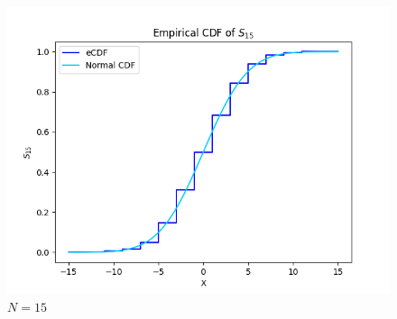 \documentclass{article}
\begin{document}
\begin{figure}[H]
\begin{minipage}{0.24\textwidth}
        \includegraphics[width=\linewidth]{ex2/ex2_15.png}
        \caption{$N=15$}
    \end{minipage}
\end{figure}
\end{document}
